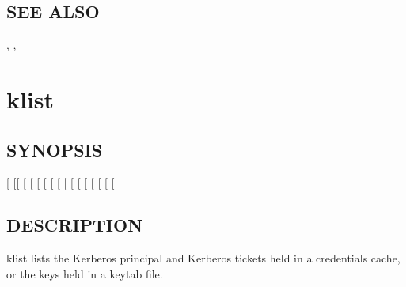 \documentclass[letterpaper,10pt,english]{sphinxmanual}
\begin{document}
\subsection{SEE ALSO}
\label{\detokenize{user/user_commands/kinit:see-also}}
\sphinxAtStartPar
{\hyperref[\detokenize{user/user_commands/klist:klist-1}]{}}, {\hyperref[\detokenize{user/user_commands/kdestroy:kdestroy-1}]{}}, {\hyperref[\detokenize{user/user_config/kerberos:kerberos-7}]{}}

\sphinxstepscope


\section{klist}
\label{\detokenize{user/user_commands/klist:klist}}\label{\detokenize{user/user_commands/klist:klist-1}}\label{\detokenize{user/user_commands/klist::doc}}

\subsection{SYNOPSIS}
\label{\detokenize{user/user_commands/klist:synopsis}}
\sphinxAtStartPar
{}
{[}\sphinxstylestrong{\sphinxhyphen{}e}{]}
{[}{[}\sphinxstylestrong{\sphinxhyphen{}c}{]} {[}\sphinxstylestrong{\sphinxhyphen{}l}{]} {[}\sphinxstylestrong{\sphinxhyphen{}A}{]} {[}\sphinxstylestrong{\sphinxhyphen{}f}{]} {[}\sphinxstylestrong{\sphinxhyphen{}s}{]} {[} {[}\sphinxstylestrong{\sphinxhyphen{}n}{]}{]}{]}
{[}\sphinxstylestrong{\sphinxhyphen{}C}{]}
{[} {[}\sphinxstylestrong{\sphinxhyphen{}i}{]} {[}\sphinxstylestrong{\sphinxhyphen{}t}{]} {[}\sphinxstylestrong{\sphinxhyphen{}K}{]}{]}
{[}\sphinxstylestrong{\sphinxhyphen{}V}{]}
{[}\sphinxstylestrong{\sphinxhyphen{}d}{]}
{[}|\sphinxstyleemphasis{keytab\_name}{]}


\subsection{DESCRIPTION}
\label{\detokenize{user/user_commands/klist:description}}
\sphinxAtStartPar
klist lists the Kerberos principal and Kerberos tickets held in a
credentials cache, or the keys held in a keytab file.
\end{document}
